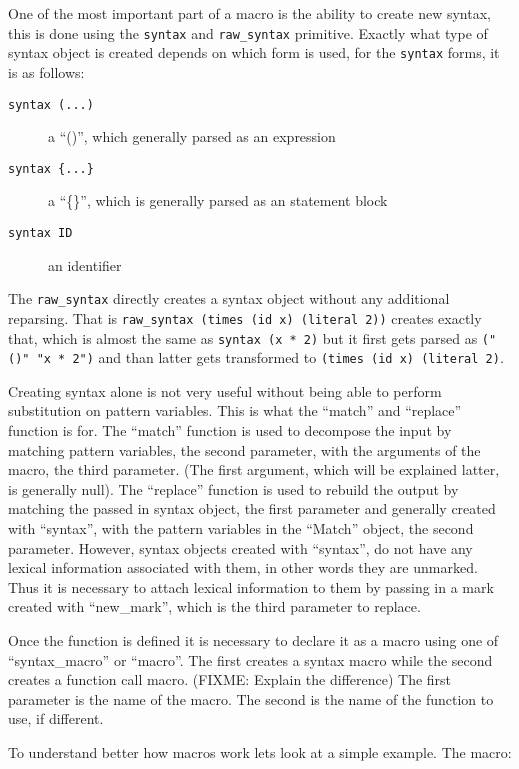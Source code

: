 \documentclass[12pt,english,letterpaper]{article}
\begin{document}
One of the most important part of a macro is the ability to create new
syntax, this is done using the \verb/syntax/ and \verb/raw_syntax/
primitive.  Exactly what type of syntax object is created depends on
which form is used, for the \verb/syntax/ forms, it is as follows:
\begin{description}
\item[\texttt{syntax (...)}] a ``()'', which generally parsed as an expression
\item[\texttt{syntax \{...\}}] a ``\{\}'', which is generally parsed as an statement block
\item[\texttt{syntax ID}] an identifier
\end{description}
The \verb/raw_syntax/ directly creates a syntax object without any
additional reparsing.  That is
\verb/raw_syntax (times (id x) (literal 2))/ creates exactly that,
which is almost the same as \verb/syntax (x * 2)/ but it first gets
parsed as \verb/("()" "x * 2")/ and than latter gets transformed to
\verb/(times (id x) (literal 2)/.

Creating syntax alone is not very useful without being able to perform
substitution on pattern variables.  This is what the ``match'' and
``replace'' function is for.  The ``match'' function is used to
decompose the input by matching pattern variables, the second
parameter, with the arguments of the macro, the third
parameter.  (The first argument, which will be explained latter, is
generally null).  The ``replace'' function is used to rebuild the
output by matching the passed in syntax object, the first parameter
and generally created with ``syntax'', with the pattern variables
in the ``Match'' object, the second parameter.  However, syntax
objects created with ``syntax'', do not have any lexical information
associated with them, in other words they are unmarked.  Thus it is
necessary to attach lexical information to them by passing in a mark
created with ``new\_mark'', which is the third parameter to replace.

Once the function is defined it is necessary to declare it as a macro
using one of ``syntax\_macro'' or ``macro''.  The first creates a
syntax macro while the second creates a function call macro. (FIXME:
Explain the difference) The first parameter is the name of the macro.
The second is the name of the function to use, if different.


To understand better how macros work lets look at a simple example.
The macro:
\end{document}
